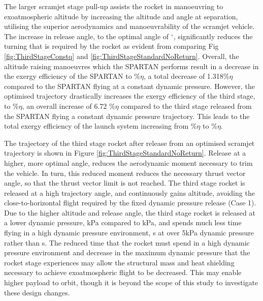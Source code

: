 The larger scramjet stage pull-up assists the rocket in manoeuvring to exoatmospheric altitude by increasing the altitude and angle at separation, utilising the superior aerodynamics and manoeuvrability of the scramjet vehicle. The increase in release angle, to the optimal angle of \secondthirdSeparationgammaStandardNoReturn$^\circ$, significantly reduces the turning that is required by the rocket as evident from comparing Fig \ref{fig:ThirdStageConstq} and \ref{fig:ThirdStageStandardNoReturn}. 
Overall, the altitude raising manoeuvres which the SPARTAN performs result in a decrease in the exergy efficiency of the SPARTAN to \secondExergyEffStandardNoReturn \%$\eta$, a total decrease of 1.318\%$\eta$ compared to the SPARTAN flying at a constant dynamic pressure. However, the optimised trajectory drastically increases the exergy efficiency of the third stage, to \thirddExergyEffStandardNoReturn \%$\eta$, an overall increase of 6.72 \%$\eta$ compared to the third stage released from the SPARTAN flying a constant dynamic pressure trajectory.  
This leads to the total exergy efficiency of the launch system increasing from \totalExergyEffConstq \%$\eta$ to \totalExergyEffStandardNoReturn \%$\eta$. 

The trajectory of the third stage rocket after release from an optimised scramjet trajectory is shown in Figure \ref{fig:ThirdStageStandardNoReturn}. Release at a higher, more optimal angle, reduces the aerodynamic moment necessary to trim the vehicle. In turn, this reduced moment reduces the necessary thrust vector angle, so that the thrust vector limit is not reached. The third stage rocket is released at a high trajectory angle, and continuously gains altitude, avoiding the close-to-horizontal flight required by the fixed dynamic pressure release (Case 1).
Due to the higher altitude and release angle, the third stage rocket is released at a lower dynamic pressure, \secondthirdSeparationqCdStandardNoReturn kPa compared to \secondthirdSeparationqConstq kPa, and spends much less time flying in a high dynamic pressure environment, \thirdqOverFiveStandard s at over 5kPa dynamic pressure rather than \thirdqOverFiveConstq s. 
The reduced time that the rocket must spend in a high dynamic pressure environment and decrease in the maximum dynamic pressure that the rocket stage experiences may allow the structural mass and heat shielding necessary to achieve exoatmospheric flight to be decreased. This may enable higher payload to orbit, though it is beyond the scope of this study to investigate these design changes. 


